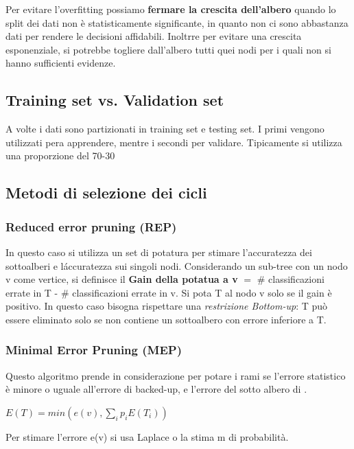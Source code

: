\documentclass[a4paper]{extarticle}
\begin{document}
Per evitare l'overfitting possiamo \textbf{fermare la crescita dell'albero} quando lo split dei dati non è statisticamente significante, in quanto non ci sono abbastanza dati per rendere le decisioni  affidabili. Inoltrre per evitare una crescita esponenziale, si potrebbe togliere dall'albero tutti quei nodi per i quali non si hanno sufficienti evidenze.

\subsection{Training set vs. Validation set}

A volte i dati sono partizionati in training set e testing set. I primi vengono utilizzati pera apprendere, mentre i secondi per validare. Tipicamente si utilizza una proporzione del 70-30%

\subsection{Metodi di selezione dei cicli}

\subsubsection{Reduced error pruning (REP)}

In questo caso si utilizza un set di potatura per stimare l'accuratezza dei sottoalberi e l\' accuratezza sui singoli nodi. Considerando un sub-tree con un nodo v come vertice, si definisce il \textbf{Gain della potatua a v} $= $ \# classificazioni errate in T - \# classificazioni errate in v. Si pota T al nodo v solo se il gain è positivo. In questo caso bisogna rispettare una \textit{restrizione Bottom-up}: T può essere eliminato solo se non contiene un sottoalbero con errore inferiore a T.

\subsubsection{Minimal Error Pruning (MEP)}

Questo algoritmo prende in considerazione per potare i rami se l'errore statistico è minore o uguale all'errore di backed-up, e l'errore del sotto albero di .

\begin{center}
$ E(T) = min(e(v), \sum\limits_{i} p_iE(T_i))$
\end{center}

Per stimare l'errore e(v) si usa Laplace o la stima m di probabilità.
\end{document}
